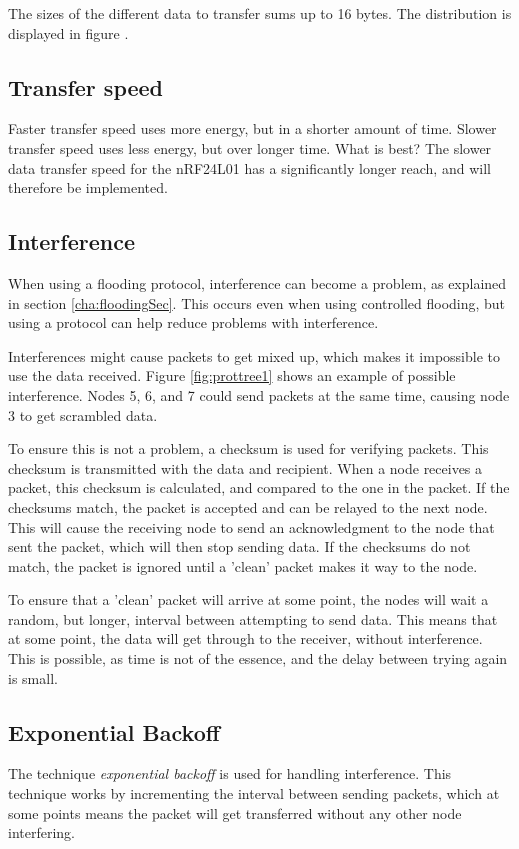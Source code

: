 The sizes of the different data to transfer sums up to 16 bytes. The distribution is displayed in figure .

\subsection{Transfer speed}
Faster transfer speed uses more energy, but in a shorter amount of time. Slower transfer speed uses less energy, but over longer time. What is best? The slower data transfer speed for the nRF24L01 has a significantly longer reach, and will therefore be implemented. 

\subsection{Interference}
When using a flooding protocol, interference can become a problem, as explained in section \ref{cha:floodingSec}. This occurs even when using controlled flooding, but using a protocol can help reduce problems with interference.

Interferences might cause packets to get mixed up, which makes it impossible to use the data received. Figure \ref{fig:prottree1} shows an example of possible interference. Nodes 5, 6, and 7 could send packets at the same time, causing node 3 to get scrambled data.

To ensure this is not a problem, a checksum is used for verifying packets. This checksum is transmitted with the data and recipient. When a node receives a packet, this checksum is calculated, and compared to the one in the packet. If the checksums match, the packet is accepted and can be relayed to the next node. This will cause the receiving node to send an acknowledgment to the node that sent the packet, which will then stop sending data.
If the checksums do not match, the packet is ignored until a 'clean' packet makes it way to the node.

To ensure that a 'clean' packet will arrive at some point, the nodes will wait a random, but longer, interval between attempting to send data. This means that at some point, the data will get through to the receiver, without interference.
This is possible, as time is not of the essence, and the delay between trying again is small.

\subsection*{Exponential Backoff}
The technique \textit{exponential backoff} is used for handling interference. This technique works by incrementing the interval between sending packets, which at some points means the packet will get transferred without any other node interfering. 

